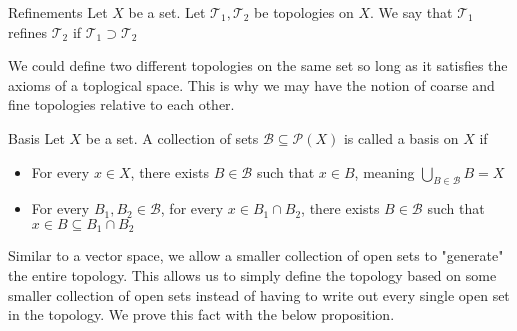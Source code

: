\documentclass[a4paper]{article}
\begin{document}
\begin{defn}{Refinements}{} Let $X$ be a set. Let $\mathcal{T}_1,\mathcal{T}_2$ be topologies on $X$. We say that $\mathcal{T}_1$ refines $\mathcal{T}_2$ if $\mathcal{T}_1\supset\mathcal{T}_2$
\end{defn}

We could define two different topologies on the same set so long as it satisfies the axioms of a toplogical space. This is why we may have the notion of coarse and fine topologies relative to each other. 

\begin{defn}{Basis}{} Let $X$ be a set. A collection of sets $\mathcal{B}\subseteq\mathcal{P}(X)$ is called a basis on $X$ if
\begin{itemize}
\item For every $x\in X$, there exists $B\in\mathcal{B}$ such that $x\in B$, meaning $\bigcup_{B\in\mathcal{B}}B=X$
\item For every $B_1,B_2\in\mathcal{B}$, for every $x\in B_1\cap B_2$, there exists $B\in\mathcal{B}$ such that $x\in B\subseteq B_1\cap B_2$
\end{itemize}
\end{defn}

Similar to a vector space, we allow a smaller collection of open sets to "generate" the entire topology. This allows us to simply define the topology based on some smaller collection of open sets instead of having to write out every single open set in the topology. We prove this fact with the below proposition. 
\end{document}
